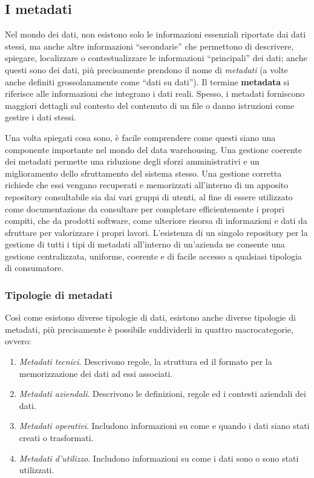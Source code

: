 \subsection{I metadati}

Nel mondo dei dati, non esistono solo le informazioni essenziali riportate dai dati stessi, ma anche altre informazioni “secondarie” che permettono di descrivere, spiegare, localizzare o contestualizzare le informazioni “principali” dei dati; anche questi sono dei dati, più precisamente prendono il nome di \textit{metadati} (a volte anche definiti grossolanamente come “dati su dati”). Il termine \textbf{metadata} si riferisce alle informazioni che integrano i dati reali. Spesso, i metadati forniscono maggiori dettagli sul contesto del contenuto di un file o danno istruzioni come gestire i dati stessi.\cite{ionos_metadata}

Una volta spiegati cosa sono, è facile comprendere come questi siano una componente importante nel mondo del data warehousing. Una gestione coerente dei metadati permette una riduzione degli sforzi amministrativi e un miglioramento dello sfruttamento del sistema stesso. Una gestione corretta richiede che essi vengano recuperati e memorizzati all’interno di un apposito repository consultabile sia dai vari gruppi di utenti, al fine di essere utilizzato come documentazione da consultare per completare efficientemente i propri compiti, che da prodotti software, come ulteriore risorsa di informazioni e dati da sfruttare per valorizzare i propri lavori. L’esistenza di un singolo repository per la gestione di tutti i tipi di metadati all’interno di un’azienda ne consente una gestione centralizzata, uniforme, coerente e di facile accesso a qualsiasi tipologia di consumatore.\cite{metadata_standards}

\subsubsection{Tipologie di metadati}

Così come esistono diverse tipologie di dati, esistono anche diverse tipologie di metadati, più precisamente è possibile suddividerli in quattro macrocategorie, ovvero:
\begin{enumerate}
    \item \textit{Metadati tecnici}. Descrivono regole, la struttura ed il formato per la memorizzazione dei dati ad essi associati.
    \item \textit{Metadati aziendali}. Descrivono le definizioni, regole ed i contesti aziendali dei dati.
    \item \textit{Metadati operativi}. Includono informazioni su come e quando i dati siano stati creati o trasformati.
    \item \textit{Metadati d’utilizzo}. Includono informazioni su come i dati sono o sono stati utilizzati.
\end{enumerate}

